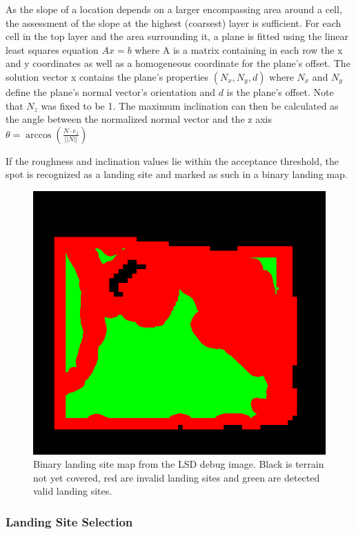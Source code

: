 As the slope of a location depends on a larger encompassing area around a cell, the assessment of the slope at the highest (coarsest) layer is sufficient. For each cell in the top layer and the area surrounding it, a plane is fitted using the linear least squares equation $Ax = b$ where A is a matrix containing in each row the x and y coordinates as well as a homogeneous coordinate for the plane's offset. The solution vector x contains the plane's properties $\left(N_x, N_y, d\right)$ where $N_x$ and $N_y$ define the plane's normal vector's orientation and $d$ is the plane's offset. Note that $N_z$ was fixed to be 1. The maximum inclination can then be calculated as the angle between the normalized normal vector and the z axis $\theta = \arccos\left(\frac{N \cdot e_z}{||N||}\right)$

If the roughness and inclination values lie within the acceptance threshold, the spot is recognized as a landing site and marked as such in a binary landing map. 

\begin{figure}[ht!]
    \centering
    \includegraphics[scale=0.5]{images/system_overview/landing_map.png}
    \caption{Binary landing site map from the LSD debug image. Black is terrain not yet covered, red are invalid landing sites and green are detected valid landing sites.}
    \label{fig:ls_map}
\end{figure}

\subsubsection{Landing Site Selection}\label{subsubsec:setup:ls_select}


